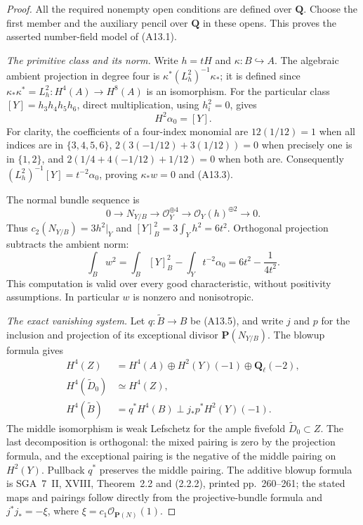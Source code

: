 \documentclass[11pt]{article}
\theoremstyle{remark}\newtheorem{remark}[theorem]{Remark}
\begin{document}
\begin{proof}
All the required nonempty open conditions are defined over
$\mathbf Q$. Choose the first member and the auxiliary pencil
over $\mathbf Q$ in these opens. This proves the asserted
number-field model of (A13.1).

\emph{The primitive class and its norm.}
Write $h=tH$ and $\kappa:B\hookrightarrow A$.
The algebraic ambient projection in degree four is
$\kappa^*(L_h^2)^{-1}\kappa_*$; it is defined since
$\kappa_*\kappa^*=L_h^2:H^4(A)\to H^8(A)$ is an isomorphism.
For the particular class $[Y]=h_3h_4h_5h_6$, direct multiplication,
using $h_i^2=0$, gives
\[
                  H^2\alpha_0=[Y].
 \tag{A13.6}
\]
For clarity, the coefficients of a four-index monomial are
$12(1/12)=1$ when all indices are in $\{3,4,5,6\}$,
$2(3(-1/12)+3(1/12))=0$ when precisely one is in $\{1,2\}$,
and $2(1/4+4(-1/12)+1/12)=0$ when both are.
Consequently $(L_h^2)^{-1}[Y]=t^{-2}\alpha_0$, proving
$\kappa_*w=0$ and (A13.3).

The normal bundle sequence is
\[
 0\longrightarrow N_{Y/B}\longrightarrow
 \mathcal O_Y^{\oplus4}\longrightarrow
 \mathcal O_Y(h)^{\oplus2}\longrightarrow0.
 \tag{A13.7}
\]
Thus $c_2(N_{Y/B})=3h^2|_Y$ and
$[Y]_B^2=3\int_Yh^2=6t^2$.
Orthogonal projection subtracts the ambient norm:
\[
 \int_Bw^2
 =\int_B[Y]_B^2-\int_Yt^{-2}\alpha_0
 =6t^2-\frac1{4t^2}.
\]
This computation is valid over every good characteristic, without
positivity assumptions. In particular $w$ is nonzero and
nonisotropic.

\emph{The exact vanishing system.}
Let $q:\widetilde B\to B$ be (A13.5), and write $j$ and $p$ for
the inclusion and projection of its exceptional divisor
$\mathbf P(N_{Y/B})$. The blowup formula gives
\[
 \begin{split}
 H^4(Z)&=H^4(A)\oplus H^2(Y)(-1)\oplus\mathbf Q_\ell(-2),\\
 H^4(\widetilde D_0)&\simeq H^4(Z),\\
 H^4(\widetilde B)&=q^*H^4(B)\perp j_*p^*H^2(Y)(-1).
 \end{split}
 \tag{A13.8}
\]
The middle isomorphism is weak Lefschetz for the ample
fivefold $\widetilde D_0\subset Z$. The last decomposition is
orthogonal: the mixed pairing is zero by the projection formula,
and the exceptional pairing is the negative of the middle pairing
on $H^2(Y)$. Pullback $q^*$ preserves the middle pairing.
The additive blowup formula is SGA~7~II, XVIII,
Theorem~2.2 and (2.2.2), printed pp.~260--261; the stated maps
and pairings follow directly from the projective-bundle formula
and $j^*j_*=-\xi$, where $\xi=c_1\mathcal O_{\mathbf P(N)}(1)$.


\end{proof}
\end{document}
